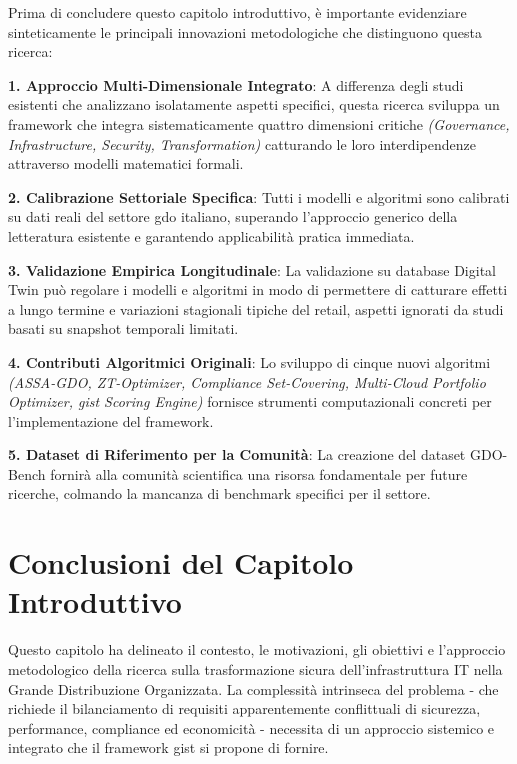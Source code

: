 Prima di concludere questo capitolo introduttivo, è importante evidenziare sinteticamente le principali innovazioni metodologiche che distinguono questa ricerca:

\textbf{1. Approccio Multi-Dimensionale Integrato}: A differenza degli studi esistenti che analizzano isolatamente aspetti specifici, questa ricerca sviluppa un framework che integra sistematicamente quattro dimensioni critiche \emph{(Governance, Infrastructure, Security, Transformation)} catturando le loro interdipendenze attraverso modelli matematici formali.

\textbf{2. Calibrazione Settoriale Specifica}: Tutti i modelli e algoritmi sono calibrati su dati reali del settore \gls{gdo} italiano, superando l'approccio generico della letteratura esistente e garantendo applicabilità pratica immediata.

\textbf{3. Validazione Empirica Longitudinale}: La validazione su database Digital Twin può regolare i modelli e algoritmi in modo di permettere di catturare effetti a lungo termine e variazioni stagionali tipiche del retail, aspetti ignorati da studi basati su snapshot temporali limitati.

\textbf{4. Contributi Algoritmici Originali}: Lo sviluppo di cinque nuovi algoritmi \emph{(ASSA-GDO, ZT-Optimizer, Compliance Set-Covering, Multi-Cloud Portfolio Optimizer, \gls{gist} Scoring Engine)} fornisce strumenti computazionali concreti per l'implementazione del framework.

\textbf{5. Dataset di Riferimento per la Comunità}: La creazione del dataset GDO-Bench fornirà alla comunità scientifica una risorsa fondamentale per future ricerche, colmando la mancanza di benchmark specifici per il settore.

\section{\texorpdfstring{\textbf{Conclusioni del Capitolo Introduttivo}}{1.8 - Conclusioni del Capitolo Introduttivo}}
\label{sec:conclusioni_cap1}

Questo capitolo ha delineato il contesto, le motivazioni, gli obiettivi e l'approccio metodologico della ricerca sulla trasformazione sicura dell'infrastruttura IT nella Grande Distribuzione Organizzata. La complessità intrinseca del problema - che richiede il bilanciamento di requisiti apparentemente conflittuali di sicurezza, performance, compliance ed economicità - necessita di un approccio sistemico e integrato che il framework \gls{gist} si propone di fornire.

